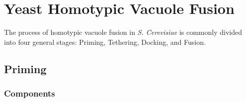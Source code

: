 \documentclass[12pt,twoside]{reedthesis}
\begin{document}
\chapter{Yeast Homotypic Vacuole Fusion}\label{YeastFusion}

The process of homotypic vacuole fusion in \emph{S. Cerevisiae} is commonly divided into four general stages: Priming, Tethering, Docking, and Fusion.

\section{Priming}\label{priming}

\subsection{Components}\label{components}
\end{document}
